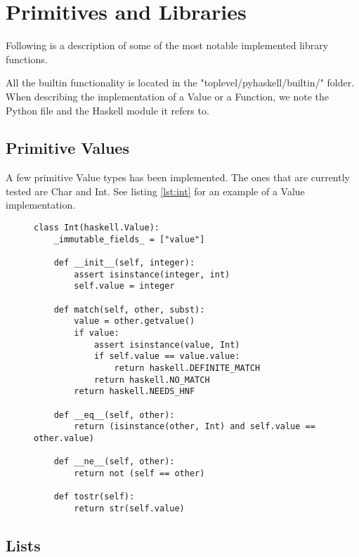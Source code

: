 

\section{Primitives and Libraries}
\label{chap:prims}


Following is a description of some of the most notable implemented library 
functions.

All the builtin functionality is located in the "toplevel/pyhaskell/builtin/"
folder. When describing the implementation of a Value or a Function, we note
the Python file and the Haskell module it refers to.

\subsection{Primitive Values}

A few primitive Value types has been implemented. The ones that are currently
tested are Char and Int. See listing \ref{lst:int} for an example of a 
Value implementation. 


\begin{figure}[H]
\lstset{ %
language=Python,
caption=Python class implementing the Haskell Int Value.,
label=lst:int
}
\begin{lstlisting}
class Int(haskell.Value):
    _immutable_fields_ = ["value"]

    def __init__(self, integer):
        assert isinstance(integer, int)
        self.value = integer

    def match(self, other, subst):
        value = other.getvalue()
        if value:
            assert isinstance(value, Int)
            if self.value == value.value:
                return haskell.DEFINITE_MATCH
            return haskell.NO_MATCH
        return haskell.NEEDS_HNF

    def __eq__(self, other):
        return (isinstance(other, Int) and self.value == other.value)

    def __ne__(self, other):
        return not (self == other)

    def tostr(self):
        return str(self.value)
\end{lstlisting}
\end{figure}

\subsection{Lists}

